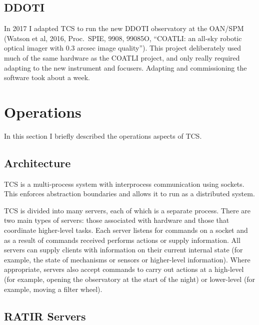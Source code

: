\documentclass{article}
\begin{document}
\subsection{DDOTI}

In 2017 I adapted TCS to run the new DDOTI observatory at the OAN/SPM (Watson et al, 2016, Proc.\ SPIE, 9908, 99085O, “COATLI: an all-sky robotic optical imager with 0.3 arcsec image quality”). This project deliberately used much of the same hardware as the COATLI project, and only really required adapting to the new instrument and focusers. Adapting and commissioning the software took about a week.

\section{Operations}

In this section I briefly described the operations aspects of TCS.

\subsection{Architecture}

TCS is a multi-process system with interprocess communication using sockets. This enforces abstraction boundaries and allows it to run as a distributed system.

TCS is divided into many servers, each of which is a separate process. There are two main types of servers: those associated with hardware and those that coordinate higher-level tasks. Each server listens for commands on a socket and as a result of commands received performs actions or supply information. All servers can supply clients with information on their current internal state (for example, the state of mechanisms or sensors or higher-level information). Where appropriate, servers also accept commands to carry out actions at a high-level (for example, opening the observatory at the start of the night) or lower-level (for example, moving a filter wheel).

\subsection{RATIR Servers}
\end{document}
